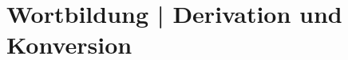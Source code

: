 \documentclass[handout,aspectratio=1610,dvipsnames]{beamer}
\begin{document}
  \section[Derivation]{Wortbildung | Derivation und Konversion}
  \let\woopsi\section\let\section\subsection\let\subsection\subsubsection
  
  \let\subsection\section\let\section\woopsi
  
\end{document}
